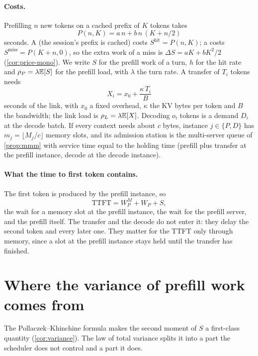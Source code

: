 \paragraph{Costs.} Prefilling $n$ new tokens on a cached prefix of $K$ tokens takes
\begin{equation}\label{L5:eq:prefill}
  P(n,K)=a\,n+b\,n\,(K+n/2)
\end{equation}
seconds. A  (the session's prefix is cached) costs $S^{\mathrm{hit}}=P(n,K)$; a
 costs $S^{\mathrm{miss}}=P(K+n,0)$, so the extra work of a miss is
$\Delta S=aK+bK^2/2$ (\cref{cor:price-mono}). We write $S$ for the prefill work of a turn,
$h$ for the hit rate and $\rho_P=\lambda\mathbb{E}[S]$ for the prefill load, with $\lambda$ the turn
rate. A transfer of $T_i$ tokens needs
\begin{equation}\label{L5:eq:transfer}
  X_i=x_0+\frac{\kappa\,T_i}{B}
\end{equation}
seconds of the link, with $x_0$ a fixed overhead, $\kappa$ the KV bytes per token and $B$
the bandwidth; the link load is $\rho_L=\lambda\mathbb{E}[X]$. Decoding $o_i$ tokens is a demand
$D_i$ at the decode batch. If every context needs about $c$ bytes, instance
$j\in\{P,D\}$ has $m_j=\lfloor M_j/c\rfloor$ memory slots, and its admission station is the
multi-server queue of \cref{prop:mmm} with service time equal to the holding time
(prefill plus transfer at the prefill instance, decode at the decode instance).

\paragraph{What the time to first token contains.} The first token is produced by the
prefill instance, so
\[
  \mathrm{TTFT}=W^M_P+W_P+S,
\]
the wait for a memory slot at the prefill instance, the wait for the prefill server,
and the prefill itself. The transfer and the decode do not enter it: they delay the
second token and every later one. They matter for the TTFT only through memory, since a
slot at the prefill instance stays held until the transfer has finished.

\section{Where the variance of prefill work comes from}\label{L5:sec:variance}

The Pollaczek--Khinchine formula makes the second moment of $S$ a first-class quantity
(\cref{cor:variance}). The law of total variance splits it into a part the scheduler
does not control and a part it does.

